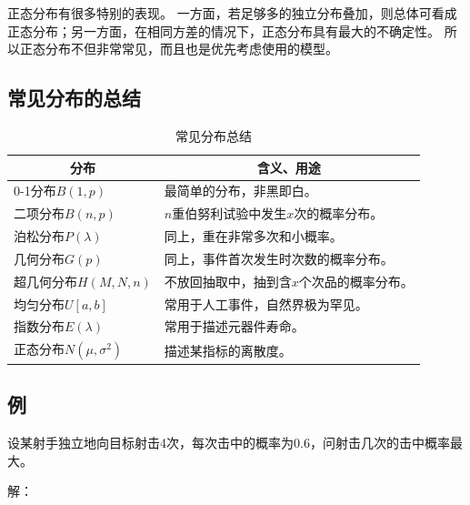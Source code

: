 \begin{tcolorbox}
正态分布有很多特别的表现。
一方面，若足够多的独立分布叠加，则总体可看成正态分布；另一方面，在相同方差的情况下，正态分布具有最大的不确定性。
所以正态分布不但非常常见，而且也是优先考虑使用的模型。
\end{tcolorbox}

\subsection{常见分布的总结}

\begin{table}[h]
\centering
\caption{常见分布总结}
\begin{tabular}{ll}
    \toprule
    \multicolumn{1}{c}{分布} & \multicolumn{1}{c}{含义、用途}  \\
    \midrule
    0-1分布$B\left( 1,p \right) $ & 最简单的分布，非黑即白。\\
    二项分布$B\left( n,p \right) $ & $n$重伯努利试验中发生$x$次的概率分布。\\
    泊松分布$P\left( \lambda \right) $ & 同上，重在非常多次和小概率。\\
    几何分布$G\left( p \right) $ & 同上，事件首次发生时次数的概率分布。\\
    超几何分布$H\left( M,N,n \right) $ & 不放回抽取中，抽到含$x$个次品的概率分布。\\
    均匀分布$U\left[ a,b \right] $ & 常用于人工事件，自然界极为罕见。\\
    指数分布$E\left( \lambda \right) $ & 常用于描述元器件寿命。\\
    正态分布$N\left( \mu ,\sigma ^2 \right) $ & 描述某指标的离散度。\\
    \bottomrule
\end{tabular}
\end{table}


\subsection{例}

\begin{example}
设某射手独立地向目标射击4次，每次击中的概率为0.6，问射击几次的击中概率最大。
\end{example}

解：

